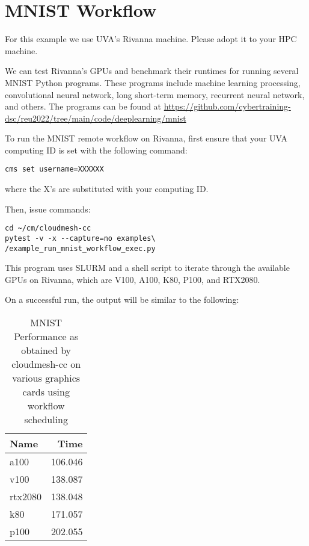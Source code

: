 \section{MNIST Workflow}\label{mnist-workflow}

For this example we use UVA's Rivanna machine. Please adopt it to your
HPC machine.

We can test Rivanna's GPUs and benchmark their runtimes for running
several MNIST Python programs. These programs include machine learning
processing, convolutional neural network, long short-term memory,
recurrent neural network, and others. The programs can be found at
\url{https://github.com/cybertraining-dsc/reu2022/tree/main/code/deeplearning/mnist}

To run the MNIST remote workflow on Rivanna, first ensure that your UVA
computing ID is set with the following command:

\begin{verbatim}
cms set username=XXXXXX
\end{verbatim}

where the X's are substituted with your computing ID.

Then, issue commands:

\begin{verbatim}
cd ~/cm/cloudmesh-cc
pytest -v -x --capture=no examples\
/example_run_mnist_workflow_exec.py
\end{verbatim}

This program uses SLURM and a shell script to iterate through the
available GPUs on Rivanna, which are V100, A100, K80, P100, and RTX2080.

On a successful run, the output will be similar to the following:

\begin{table}[!ht]
\caption{MNIST Performance as obtained by cloudmesh-cc on various graphics cards using workflow scheduling}
    \centering
    \begin{tabular}{lr}
    \hline
        Name & Time \\ \hline
        a100 & 106.046 \\ 
        v100 & 138.087 \\ 
        rtx2080 & 138.048 \\
        k80 & 171.057 \\ 
        p100 & 202.055 \\
    \end{tabular}
  \end{table}
  
